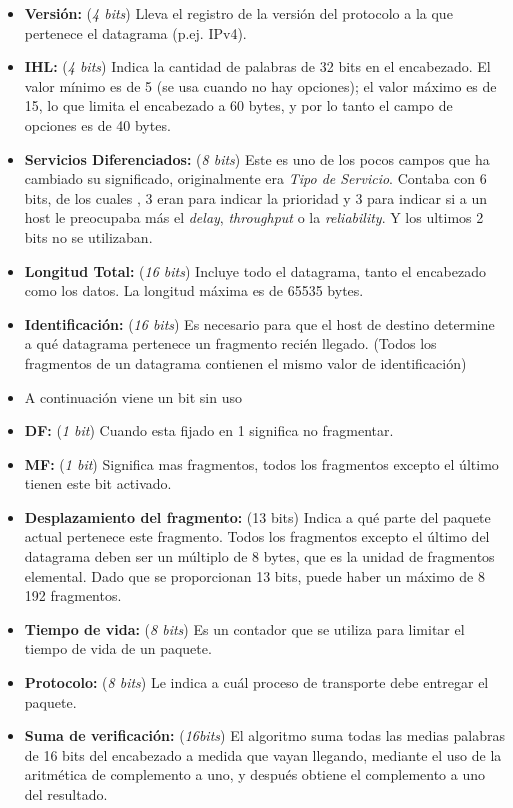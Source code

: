 	\begin{itemize}
		\item \textbf{Versión:} (\textit{4 bits}) Lleva el registro de la versión del protocolo a la que pertenece el datagrama (p.ej. IPv4).
		\item \textbf{IHL:} (\textit{4 bits}) Indica la cantidad de palabras de 32 bits en el encabezado. El valor mínimo es de 5 (se usa cuando no hay opciones); el valor
máximo es de 15, lo que limita el encabezado a 60 bytes, y por lo tanto el campo de opciones es de 40 bytes.
		\item \textbf{Servicios Diferenciados:} (\textit{8 bits}) Este es uno de los pocos campos que ha cambiado su significado, originalmente era \textit{Tipo de Servicio}. Contaba con 6 bits, de los cuales , 3 eran para indicar la prioridad y 3 para indicar si a un host le
preocupaba más el \textit{delay}, \textit{throughput} o la \textit{reliability}. Y los ultimos 2 bits no se utilizaban.
		\item \textbf{Longitud Total:} (\textit{16 bits}) Incluye todo el datagrama, tanto el encabezado como los datos. La longitud máxima es de 65535 bytes.
		\item \textbf{Identificación:} (\textit{16 bits}) Es necesario para que el host de destino determine a qué datagrama pertenece un
fragmento recién llegado. (Todos los fragmentos de un datagrama contienen el mismo valor de identificación)
		\item A continuación viene un bit sin uso
		\item \textbf{DF:} (\textit{1 bit}) Cuando esta fijado en 1 significa no fragmentar.
		\item \textbf{MF:} (\textit{1 bit}) Significa mas fragmentos, todos los fragmentos excepto el último tienen este bit activado.
		\item \textbf{Desplazamiento del fragmento:} (13 bits) Indica a qué parte del paquete actual pertenece este fragmento. Todos los fragmentos excepto el último del datagrama deben ser un múltiplo de 8 bytes, que es la unidad de fragmentos elemental. Dado que se proporcionan 13 bits, puede haber un máximo de 8 192 fragmentos.
		\item \textbf{Tiempo de vida:} (\textit{8 bits}) Es un contador que se utiliza para limitar el tiempo de vida de un paquete.
		\item \textbf{Protocolo:} (\textit{8 bits}) Le indica a cuál proceso de transporte debe entregar el paquete.
		\item \textbf{Suma de verificación:} (\textit{16bits}) El algoritmo suma todas las medias palabras de 16 bits del encabezado a medida que vayan llegando, mediante el uso de la aritmética de complemento a uno, y después obtiene el complemento a uno del resultado.

\end{itemize}
